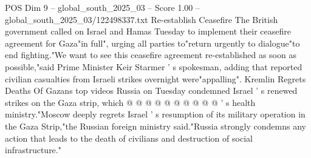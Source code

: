 \begin{textsample}{POS Dim 9 – global\_south\_2025\_03 – Score 1.00 – global\_south\_2025\_03/122498337.txt}
Re-establish Ceasefire The British government called on Israel and Hamas Tuesday to implement their ceasefire agreement for Gaza"in full", urging all parties to"return urgently to dialogue"to end fighting."We want to see this ceasefire agreement re-established as soon as possible,"said Prime Minister Keir Starmer ' s spokesman, adding that reported civilian casualties from Israeli strikes overnight were"appalling".
Kremlin Regrets Deaths Of Gazans top videos Russia on Tuesday condemned Israel ' s renewed strikes on the Gaza strip, which @ @ @ @ @ @ @ @ @ @ ' s health ministry."Moscow deeply regrets Israel ' s resumption of its military operation in the Gaza Strip,"the Russian foreign ministry said."Russia strongly condemns any action that leads to the death of civilians and destruction of social infrastructure."

\end{textsample}
